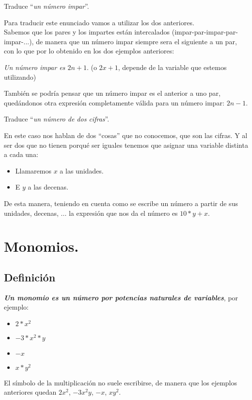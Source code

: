 \documentclass[a4paper,11pt,answers]{exam}
\begin{document}
\begin{questions}
  \question Traduce ``\emph{un número impar}''.
    \begin{solution}
      Para traducir este enunciado vamos a utilizar los dos anteriores.\\
      Sabemos que los pares y los impartes están intercalados (impar-par-impar-par-impar-...), de manera que un número impar siempre sera el siguiente a un par, con lo que por lo obtenido en los dos ejemplos anteriores:
      \begin{center}
        \emph{Un número impar es $2n+1$}. \small (o $2x+1$, depende de la variable que estemos utilizando) 
      \end{center}

      También se podría pensar que un número impar es el anterior a uno par, quedándonos otra expresión completamente válida para un número impar: $2n-1$.
    \end{solution}

  \question Traduce ``\emph{un número de dos cifras}''.
    \begin{solution}
      En este caso nos hablan de dos ``cosas'' que no conocemos, que son las cifras. Y al ser dos que no tienen porqué ser iguales tenemos que asignar una variable distinta a cada una:
      \begin{itemize}
      \item Llamaremos $x$ a las unidades.
      \item E $y$ a las decenas.
      \end{itemize}
      De esta manera, teniendo en cuenta como se escribe un número a partir de sus unidades, decenas, ... la expresión que nos da el número es $10*y + x$.
    \end{solution}
  \end{questions}

  \section{Monomios.}
  \subsection{Definición}
  \emph{\textbf{Un monomio es un número por potencias naturales de variables}}, por ejemplo:
  \begin{itemize}
  \item $2*x^2$
  \item $-3*x^2 *y$
  \item $-x$
  \item $x*y^2$
  \end{itemize}
  El símbolo de la multiplicación no suele escribirse, de manera que los ejemplos anteriores quedan $2x^2$, $-3x^2 y$, $-x$, $xy^2$.
\end{document}
